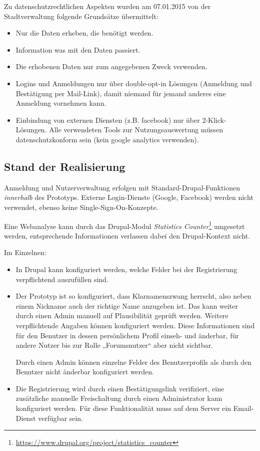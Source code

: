 \documentclass[11pt,a4paper,twoside]{article}
\begin{document}
Zu datenschutzrechtlichen Aspekten wurden am 07.01.2015 von der
Stadtverwaltung folgende Grundsätze übermittelt:
\begin{itemize}\itemsep0pt
\item Nur die Daten erheben, die benötigt werden.
\item Information was mit den Daten passiert.
\item Die erhobenen Daten nur zum angegebenen Zweck verwenden.
\item Logins und Anmeldungen nur über double-opt-in Lösungen (Anmeldung und
  Bestätigung per Mail-Link), damit niemand für jemand anderes eine Anmeldung
  vornehmen kann.
\item Einbindung von externen Diensten (z.B. facebook) nur über
  2-Klick-Lösungen.  Alle verwendeten Tools zur Nutzungsauswertung müssen
  datenschutzkonform sein (kein google analytics verwenden).
\end{itemize}

\subsection*{Stand der Realisierung}

Anmeldung und Nutzerverwaltung erfolgen mit Standard-Drupal-Funktionen
\emph{innerhalb} des Prototyps. Externe Login-Dienste (Google, Facebook)
werden nicht verwendet, ebenso keine Single-Sign-On-Konzepte. 

Eine Webanalyse kann durch das Drupal-Modul \emph{Statistics
  Counter}\footnote{\url{https://www.drupal.org/project/statistics_counter}}
umgesetzt werden, entsprechende Informationen verlassen dabei den
Drupal-Kontext nicht.
\pagebreak[3]

Im Einzelnen:
\begin{itemize}\itemsep0pt
\item In Drupal kann konfiguriert werden, welche Felder bei der Registrierung
  verpflichtend auszufüllen sind. 
\item Der Prototyp ist so konfiguriert, dass Klarnamenszwang herrscht, also
  neben einem Nickname auch der richtige Name anzugeben ist. Das kann weiter
  durch einen Admin manuell auf Plausibilität geprüft werden.  Weitere
  verpflichtende Angaben können konfiguriert werden. Diese Informationen sind
  für den Benutzer in dessen persönlichem Profil einseh- und änderbar, für
  andere Nutzer bis zur Rolle „Forumsnutzer“ aber nicht sichtbar.  

  Durch einen Admin können einzelne Felder des Benutzerprofils als durch den
  Benutzer nicht änderbar konfiguriert werden.
\item Die Registrierung wird durch einen Bestätigungslink verifiziert, eine
  zusätzliche manuelle Freischaltung durch einen Administrator kann
  konfiguriert werden. Für diese Funktionalität muss auf dem Server ein
  Email-Dienst verfügbar sein.
\end{itemize}
\end{document}
